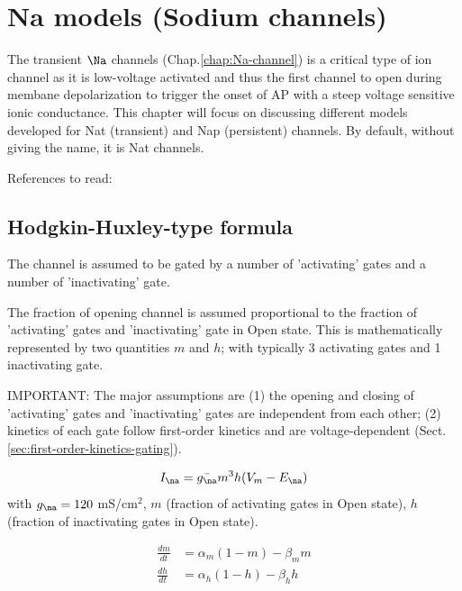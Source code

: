 \chapter{Na models (Sodium channels)}
\label{chap:Na_models}

The transient $\Na$ channels (Chap.\ref{chap:Na-channel}) is a critical type of
ion channel as it is low-voltage activated and thus the first channel to open
during membane depolarization to trigger the onset of AP with a steep voltage
sensitive ionic conductance. This chapter will focus on discussing different
models developed for Nat (transient) and Nap (persistent) channels. By default,
without giving the name, it is Nat channels.


References to read: ~\citep{clancy1999,grandi2007,irvine1999}

\citep{hanck1990}


\section{Hodgkin-Huxley-type formula}
\label{sec:Hodgkin-Huxley-Na-models}

The channel is assumed to be gated by a number of 'activating' gates and a
number of 'inactivating' gate. 

The fraction of opening channel is assumed proportional to the fraction of
'activating' gates and 'inactivating' gate in Open state. This is
mathematically represented by two quantities $m$ and $h$; with typically 3
activating gates and 1 inactivating gate.

IMPORTANT: The major assumptions are (1) the opening and closing of
'activating' gates and 'inactivating' gates are independent from each other; (2)
kinetics of each gate follow first-order kinetics
and are voltage-dependent (Sect.\ref{sec:first-order-kinetics-gating}).

\begin{equation}
I_\na = \bar{g_\na} m^3 h (V_m-E_\na)
\end{equation}
with $g_\na = 120$ mS/cm$^2$, $m$ (fraction of activating gates in Open state),
$h$ (fraction of inactivating gates in Open state).

\begin{equation}
\begin{split}
\frac{dm}{dt} &= \alpha_m (1-m) - \beta_m m \\
\frac{dh}{dt} &= \alpha_h (1-h) - \beta_h h \\
\end{split}
\end{equation}

